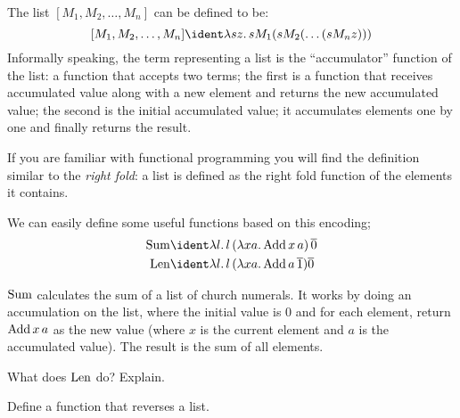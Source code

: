 \documentclass[../../../include/open-logic-section]{subfiles}
\begin{document}

The list $[M_1, M_2, \ldots, M_n]$ can be defined to be:
\[
  [M_1, M_2, \ldots, M_n] \ident \lambd[sz][s M_1 (s M_2 (\ldots (s M_n z)))]
\]
Informally speaking, the term representing a list is the
``accumulator'' function of the list: a function that accepts two
terms; the first is a function that receives accumulated value along
with a new element and returns the new accumulated value; the second
is the initial accumulated value; it accumulates elements one by one
and finally returns the result.

\begin{digress}
  If you are familiar with functional programming you will find the
  definition similar to the \emph{right fold}: a list is defined as
  the right fold function of the elements it contains.
\end{digress}

We can easily define some useful functions based on this encoding; 
\begin{align*}
  \fn{Sum} & \ident
  \lambd[l][l \, (\lambd[xa][\fn{Add} \, x \, a])\,  \num{0}]\\
  \fn{Len} & \ident
  \lambd[l][l \, (\lambd[xa][\fn{Add} \, a \, \num{1}]) \num{0}]
\end{align*}

$\mathrm{Sum}$ calculates the sum of a list of church numerals. It works
by doing an accumulation on the list, where the initial value is
$\num{0}$ and for each element, return $\mathrm{Add} \, x\, a$ as the new
value (where $x$ is the current element and $a$ is the accumulated
value). The result is the sum of all elements.

\begin{prob}
  What does $\mathrm{Len}$ do? Explain.
\end{prob}

\begin{prob}
  Define a function that reverses a list.
\end{prob}
\end{document}
